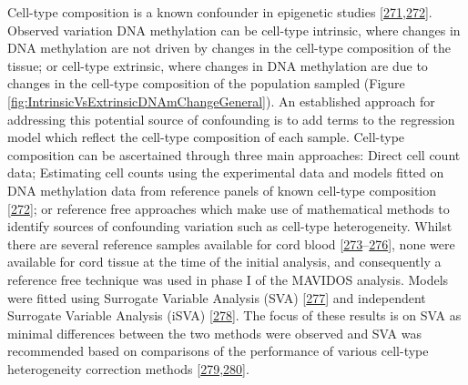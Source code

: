 \documentclass[
]{book}
\begin{document}
Cell-type composition is a known confounder in epigenetic studies {[}\protect\hyperlink{ref-Jaffe2014}{271},\protect\hyperlink{ref-Houseman2012}{272}{]}.
Observed variation DNA methylation can be cell-type intrinsic, where changes in DNA methylation are not driven by changes in the cell-type composition of the tissue; or cell-type extrinsic, where changes in DNA methylation are due to changes in the cell-type composition of the population sampled (Figure \ref{fig:IntrinsicVsExtrinsicDNAmChangeGeneral}).
An established approach for addressing this potential source of confounding is to add terms to the regression model which reflect the cell-type composition of each sample.
Cell-type composition can be ascertained through three main approaches: Direct cell count data; Estimating cell counts using the experimental data and models fitted on DNA methylation data from reference panels of known cell-type composition {[}\protect\hyperlink{ref-Houseman2012}{272}{]}; or reference free approaches which make use of mathematical methods to identify sources of confounding variation such as cell-type heterogeneity.
Whilst there are several reference samples available for cord blood {[}\protect\hyperlink{ref-Cardenas2016}{273}--\protect\hyperlink{ref-Gervin2016}{276}{]}, none were available for cord tissue at the time of the initial analysis, and consequently a reference free technique was used in phase I of the MAVIDOS analysis.
Models were fitted using Surrogate Variable Analysis (SVA) {[}\protect\hyperlink{ref-Leek2007}{277}{]} and independent Surrogate Variable Analysis (iSVA) {[}\protect\hyperlink{ref-Teschendorff2011}{278}{]}.
The focus of these results is on SVA as minimal differences between the two methods were observed and SVA was recommended based on comparisons of the performance of various cell-type heterogeneity correction methods {[}\protect\hyperlink{ref-McGregor2016}{279},\protect\hyperlink{ref-Teschendorff2017}{280}{]}.
\end{document}
